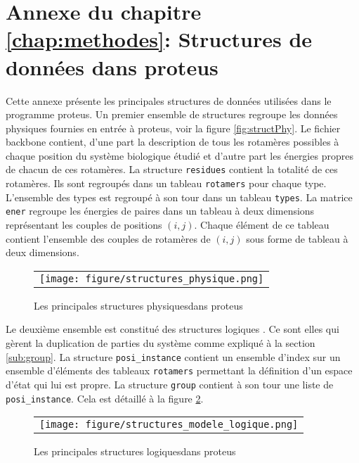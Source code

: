 \chapter*{Annexe du chapitre \ref{chap:methodes}: Structures de données dans proteus}
\label{chap:annexeproteus}

Cette annexe présente les principales structures de données utilisées dans le programme proteus. Un premier ensemble de structures regroupe les données physiques fournies en entrée à proteus, voir la figure \vref{fig:structPhy}. Le fichier backbone contient, d'une part la description de tous les rotamères possibles à chaque position du système biologique étudié et d'autre part les énergies propres de chacun de ces rotamères. La structure \verb!residues! contient la totalité de ces rotamères. Ils sont regroupés dans un tableau \verb!rotamers!  pour chaque type. L'ensemble des types est regroupé à son tour dans un tableau \verb!types!. La matrice \verb!ener! regroupe les énergies de paires dans un tableau à deux dimensions représentant les couples de positions $(i,j)$. Chaque élément de ce tableau contient l'ensemble des couples de rotamères de $(i,j)$  sous forme de tableau à deux dimensions.
   \begin{figure}[!htbp]
     \centering
     \begin{tabular}{c}
       \texttt{[image: figure/structures\_physique.png]} 
     \end{tabular}
     
     \caption{Les principales structures \og physiques\fg  dans proteus}
\label{fig:structPhy}
   \end{figure}

Le deuxième ensemble est constitué des structures \og logiques \fg. Ce sont elles qui gèrent la duplication de parties du système comme expliqué à la section \vref{sub:group}. La structure \verb!posi_instance! contient un ensemble d'index sur un ensemble d'éléments des tableaux \verb!rotamers! permettant la définition d'un espace d'état qui lui est propre. La structure \verb!group! contient à son tour une liste de \verb!posi_instance!. Cela est détaillé à la figure  \ref{fig:structLog}.    
   \begin{figure}[!htbp]
     \centering
     \begin{tabular}{c}
       \texttt{[image: figure/structures\_modele\_logique.png]} 
     \end{tabular}
     
     \caption{Les principales structures \og logiques\fg  dans proteus}
\label{fig:structLog}
   \end{figure}

